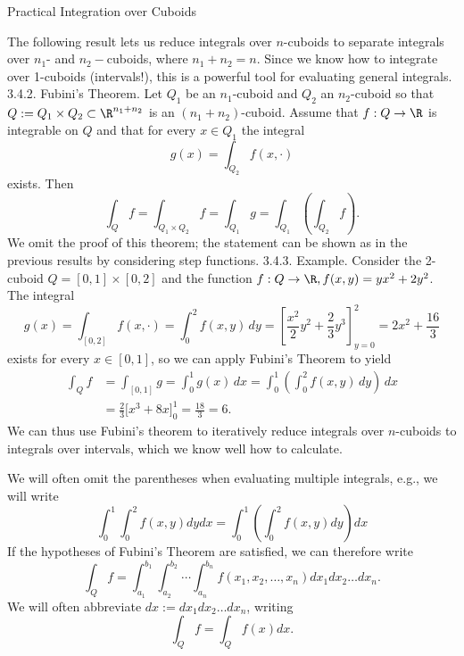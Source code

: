 \documentclass[smaller,hyperref={CJKbookmarks=true}]{beamer}
\begin{document}
\begin{frame}{Practical Integration over Cuboids}
\begin{spacing}{1}
The following result lets us reduce integrals over $n$-cuboids to separate integrals over $n_1$- and $n_2-$cuboids, where $n_1+n_2=n$. Since we know how to integrate over 1-cuboids (intervals!), this is a powerful tool for evaluating general integrals.\\[4pt]
\alert{3.4.2. Fubini's Theorem.} Let $Q_1$ be an $n_1$-cuboid and $Q_2$ an $n_2$-cuboid so that $Q:=Q_1\times Q_2\subset\R^{n_1+n_2}$ is an $(n_1+n_2)$-cuboid. Assume that $f:Q\to\R$ is integrable on $Q$ and that for every $x\in Q_1$ the integral
\[g(x)=\int_{Q_2}f(x,\cdot)\]
exists. Then
\[\int_Qf=\int_{Q_1\times Q_2}f=\int_{Q_1}g=\int_{Q_1}\left(\int_{Q_2}f\right).\]
We omit the proof of this theorem; the statement can be shown as in the
previous results by considering step functions.
\newpage
\alert{3.4.3. Example.} Consider the 2-cuboid $Q=[0,1]\times[0,2]$ and the function $f:Q\to\R,f(x,y)=yx^2+2y^2$. The integral
\[g(x)=\int_{[0,2]}f(x,\cdot)=\int_{0}^{2}
f(x,y)\,dy=\left[\frac{x^2}{2}y^2+\frac{2}{3}y^3\right]
_{y=0}^2=2x^2+\frac{16}{3}\]
exists for every $x\in[0,1]$, so we can apply Fubini's Theorem to yield
\begin{equation*}
  \begin{split}
     \int_Qf &=\int_{[0,1]}g=\int_{0}^{1}g(x)\,dx=\int_{0}^{1}
     \left(\int_{0}^{2}f(x,y)\,dy\right)\,dx \\
       &=\frac{2}{3}\big[x^3+8x\big]_0^1=\frac{18}{3}=6.
  \end{split}
\end{equation*}
We can thus use Fubini's theorem to iteratively reduce integrals over
$n$-cuboids to integrals over intervals, which we know well how to calculate.
\end{spacing}
\newpage
\begin{spacing}{1.1}
We will often omit the parentheses when evaluating multiple integrals,
e.g., we will write
\[\int_{0}^{1}\int_{0}^{2}f(x,y)dydx=\int_{0}^{1}
\left(\int_{0}^{2}f(x,y)dy\right)dx\]
If the hypotheses of Fubini's Theorem are satisfied, we can therefore write
\[\int_Qf=\int_{a_1}^{b_1}\int_{a_2}^{b_2}
\cdots\int_{a_n}^{b_n}f(x_1,x_2,\ldots,x_n)dx_1
dx_2\ldots dx_n.\]
We will often abbreviate $dx:=dx_1dx_2\ldots dx_n$, writing
\[\int_Qf=\int_Qf(x)dx.\]
\end{spacing}
\end{frame}
\end{document}
